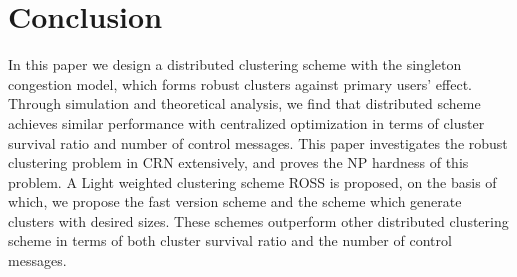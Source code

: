 \documentclass[journal,comsoc]{IEEEtran}
\theoremstyle{mytheoremstyle}
\theoremstyle{mytheoremstyle}
\theoremstyle{mytheoremstyle}
\begin{document}
%
%
%


\section{Conclusion}
\label{conclusion}
In this paper we design a distributed clustering scheme with the singleton congestion model, which forms robust clusters against primary users' effect.
Through simulation and theoretical analysis, we find that distributed scheme achieves similar performance with centralized optimization in terms of cluster survival ratio and number of control messages.
This paper investigates the robust clustering problem in CRN extensively, and proves the NP hardness of this problem.
A Light weighted clustering scheme ROSS is proposed, on the basis of which, we propose the fast version scheme and the scheme which generate clusters with desired sizes.
These schemes outperform other distributed clustering scheme in terms of both cluster survival ratio and the number of control messages.

\end{document}
